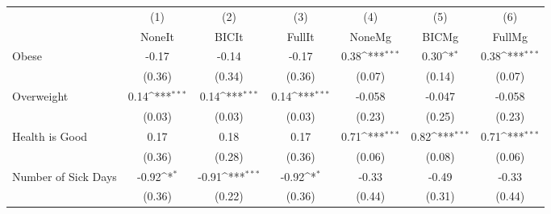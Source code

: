 {
\def\sym#1{\ifmmode^{#1}\else\(^{#1}\)\fi}
\begin{tabular}{l*{6}{c}}
\toprule
            &\multicolumn{1}{c}{(1)}&\multicolumn{1}{c}{(2)}&\multicolumn{1}{c}{(3)}&\multicolumn{1}{c}{(4)}&\multicolumn{1}{c}{(5)}&\multicolumn{1}{c}{(6)}\\
            &\multicolumn{1}{c}{NoneIt}&\multicolumn{1}{c}{BICIt}&\multicolumn{1}{c}{FullIt}&\multicolumn{1}{c}{NoneMg}&\multicolumn{1}{c}{BICMg}&\multicolumn{1}{c}{FullMg}\\
\midrule
Obese       &       -0.17         &       -0.14         &       -0.17         &        0.38\sym{***}&        0.30\sym{*}  &        0.38\sym{***}\\
            &      (0.36)         &      (0.34)         &      (0.36)         &      (0.07)         &      (0.14)         &      (0.07)         \\
\addlinespace
Overweight  &        0.14\sym{***}&        0.14\sym{***}&        0.14\sym{***}&      -0.058         &      -0.047         &      -0.058         \\
            &      (0.03)         &      (0.03)         &      (0.03)         &      (0.23)         &      (0.25)         &      (0.23)         \\
\addlinespace
Health is Good&        0.17         &        0.18         &        0.17         &        0.71\sym{***}&        0.82\sym{***}&        0.71\sym{***}\\
            &      (0.36)         &      (0.28)         &      (0.36)         &      (0.06)         &      (0.08)         &      (0.06)         \\
\addlinespace
Number of Sick Days&       -0.92\sym{*}  &       -0.91\sym{***}&       -0.92\sym{*}  &       -0.33         &       -0.49         &       -0.33         \\
            &      (0.36)         &      (0.22)         &      (0.36)         &      (0.44)         &      (0.31)         &      (0.44)         \\
\bottomrule
\end{tabular}
}
